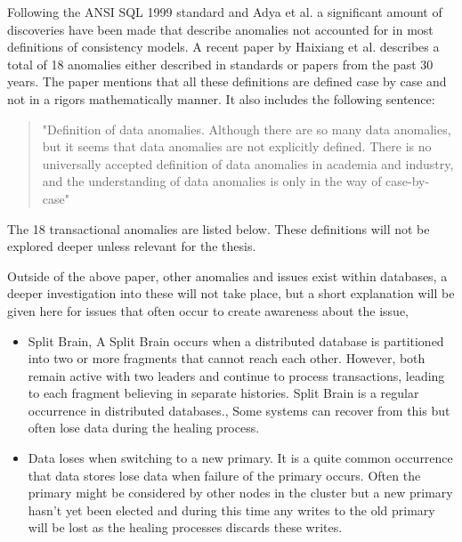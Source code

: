 \documentclass[a4paper,10pt,titlepage]{report}
\begin{document}
Following the ANSI SQL 1999 \cite{ansisql1999} standard and Adya et al. \cite{Adya99weakconsistency} a significant amount of discoveries have been made that describe anomalies not accounted for in most definitions of consistency models. A recent paper by Haixiang et al. \cite{li2021coo} describes a total of 18 anomalies either described in standards or papers from the past 30 years. The paper mentions that all these definitions are defined case by case and not in a rigors mathematically manner. It also includes the following sentence: 
\begin{quote}
    "Definition of data anomalies. Although there are so many data anomalies, but it seems that data anomalies are not explicitly defined. There is no universally accepted definition of data anomalies in academia and industry, and the understanding of data anomalies is only in the way of case-by-case" \cite{li2021coo}
\end{quote}

The 18 transactional anomalies are listed below. These definitions will not be explored deeper unless relevant for the thesis.

\vspace{2mm}

\vspace{2mm}

Outside of the above paper, other anomalies and issues exist within databases, a deeper investigation into these will not take place, but a short explanation will be given here for issues that often occur to create awareness about the issue,
\begin{itemize}
    \item Split Brain, A Split Brain occurs when a distributed database is partitioned into two or more fragments that cannot reach each other. However, both remain active with two leaders and continue to process transactions, leading to each fragment believing in separate histories. Split Brain is a regular occurrence in distributed databases.\cite{aphyrelasticsearch, jepsenscylla, jepsenhazelcast}, Some systems can recover from this but often lose data during the healing process.
    \item Data loses when switching to a new primary. It is a quite common occurrence that data stores lose data when failure of the primary occurs. Often the primary might be considered by other nodes in the cluster but a new primary hasn't yet been elected and during this time any writes to the old primary will be lost as the healing processes discards these writes.
\end{itemize}
\end{document}
